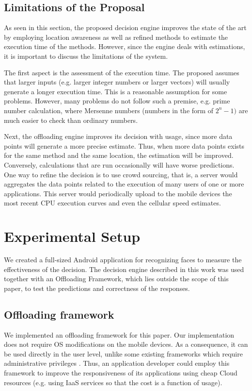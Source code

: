 \documentclass[10pt, conference, letterpaper]{IEEEtran}
\begin{document}
\subsection{Limitations of the Proposal}

As seen in this section, the proposed decision engine improves the state of the art by employing location awareness as well as refined methods to estimate the execution time of the methods. However, since the engine deals with estimations, it is important to discuss the limitations of the system.

The first aspect is the assessment of the execution time. The proposed assumes that larger inputs (e.g. larger integer numbers or larger vectors) will usually generate a longer execution time. This is a reasonable assumption for some problems. However, many problems do not follow such a premise, e.g. prime number calculation, where Mersenne  numbers (numbers in the form of $2^n-1)$ are much easier to check than ordinary numbers. 

Next, the offloading engine improves its decision with usage, since more data points will generate a more precise estimate. Thus, when more data points exists for the same method and the same location, the estimation will be improved. Conversely, calculations that are run occasionally will have worse predictions. One way to refine the decision is to use crowd sourcing, that is,  a server would aggregates the data points related to the execution of many users of one or more applications. This server would periodically upload to the mobile devices the most recent CPU execution curves and even the cellular speed estimates.

\section{Experimental Setup}
\label{sec:setup}

We created a full-sized Android application for recognizing faces to measure the effectiveness of the decision. The decision engine described in this work was used together with an Offloading Framework, which lies outside the scope of this paper, to test the predictions and correctness of the responses.

\subsection{Offloading framework}

We implemented an offloading framework for this paper. Our implementation does not require OS modifications on the mobile devices. As a consequence, it can be used directly in the user level, unlike some existing frameworks which require administrative privileges  \cite{Chun:2011:CEE:1966445.1966473}. Thus, an application developer could employ this framework to improve the responsiveness of its applications using cheap Cloud resources (e.g. using IaaS services so that the cost is a function of usage).
\end{document}
